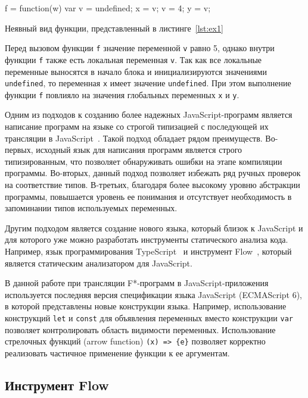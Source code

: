 \begin{listing}
\begin{pyglist}[language=javascript,numbers=none,numbersep=5pt, fontsize=\small]
    f = function(w){
        var v = undefined;
        x = v; v = 4; y = v;
    }
\end{pyglist}
\caption{Неявный вид функции, представленный в листинге~\ref{lst:ex1}}
\label{lst:ex2} 
\end{listing}

Перед вызовом функции \verb|f| значение переменной \verb|v| равно 5, однако внутри функции \verb|f| также есть локальная переменная \verb|v|. Так как все локальные переменные выносятся в начало блока и инициализируются значениями \verb|undefined|, то переменная \verb|x| имеет значение \verb|undefined|. При этом выполнение функции \verb|f| повлияло на значения глобальных переменных \verb|x| и \verb|y|. 

Одним из подходов к созданию более надежных JavaScript-программ является написание программ на языке со строгой типизацией с последующей их трансляции в JavaScript~\cite{listjs}. Такой подход обладает рядом преимуществ. Во-первых, исходный язык для написания программ является строго типизированным, что позволяет обнаруживать ошибки на этапе компиляции программы. Во-вторых, данный подход позволяет избежать ряд ручных проверок на соответствие типов. В-третьих, благодаря более высокому уровню абстракции программы, повышается уровень ее понимания и отсутствует необходимость в запоминании типов используемых переменных. 

Другим подходом является создание нового языка, который близок к JavaScript и для которого уже можно разработать инструменты статического анализа кода. Например, язык программирования TypeScript~\cite{typeScript} и инструмент Flow~\cite{flow}, который является статическим анализатором для JavaScript.

В данной работе при трансляции F*-программ в JavaScript-приложения используется последняя версия спецификации языка JavaScript (ECMAScript 6), в которой представлены новые конструкции языка. Например, использование конструкций \verb|let| и \verb|const| для объявления переменных вместо конструкции \verb|var| позволяет контролировать область видимости переменных. Использование стрелочных функций (arrow function) \verb|(x) => {e}| позволяет корректно реализовать частичное применение функции к ее аргументам.

\subsection{Инструмент Flow}

